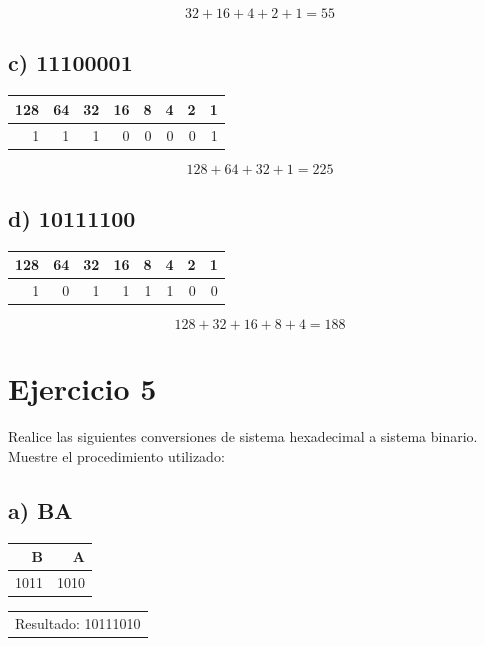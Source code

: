 \documentclass[12pt]{article}
\begin{document}
\[
32 + 16 + 4 + 2 + 1 = 55
\]

\subsection*{c) 11100001}
\label{sec:org0f6ed5c}
\begin{center}
\begin{tabular}{rrrrrrrr}
128 & 64 & 32 & 16 & 8 & 4 & 2 & 1\\
\hline
1 & 1 & 1 & 0 & 0 & 0 & 0 & 1\\
\end{tabular}
\end{center}

\[
128 + 64 + 32 + 1  = 225
\]

\subsection*{d) 10111100}
\label{sec:org6b48412}
\begin{center}
\begin{tabular}{rrrrrrrr}
128 & 64 & 32 & 16 & 8 & 4 & 2 & 1\\
\hline
1 & 0 & 1 & 1 & 1 & 1 & 0 & 0\\
\end{tabular}
\end{center}

\[
128 + 32 + 16 + 8 + 4 = 188
\]

\section*{Ejercicio 5}
\label{sec:orgb451fd9}
Realice las siguientes conversiones de sistema hexadecimal a sistema binario. Muestre el procedimiento utilizado:

\subsection*{a) BA}
\label{sec:org8902887}
\begin{mdframed}
\begin{center}
\begin{tabular}{rr}
B & A\\
\hline
1011 & 1010\\
\end{tabular}
\end{center}

\begin{center}
\begin{tabular}{l}
Resultado: 10111010\\
\end{tabular}
\end{center}
\end{mdframed}
\end{document}
